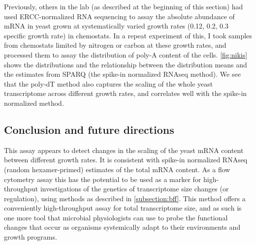
Previously, others in the lab (as described at the beginning of this
section) had used ERCC-normalized RNA sequencing
to assay the absolute abundance of mRNA in yeast grown at
systematically varied growth rates (0.12, 0.2, 0.3 specific growth 
rate) in chemostats. In a repeat experiment of this, I took samples 
from chemostats limited by nitrogen or carbon at these growth rates, 
and processed them to assay the distribution of poly-A content of the 
cells. \autoref{fig:nikis} shows the distributions and the
relationship between the distribution means and the estimates from
SPARQ (the spike-in normalized RNAseq method). We see that the poly-dT
method also captures the scaling of the whole yeast transcriptome
across different growth rates, and correlates well with the spike-in
normalized method.


\subsection{Conclusion and future directions}

This assay appears to detect changes in the scaling of the yeast
mRNA content between different growth rates. 
It is consistent with spike-in normalized RNAseq (random 
hexamer-primed) estimates of the total mRNA content.
As a flow cytometry 
assay this has the potential to be used as a marker for
high-throughput investigations of the genetics of transcriptome size
changes (or regulation), using methods as described in
\autoref{subsection:bff}. 
This method offers a conveniently high-throughput assay for total
transcriptome size, and as such is one more tool that microbial
physiologists can use to probe the functional changes that occur as
organisms systemically adapt to their environments and growth
programs.

